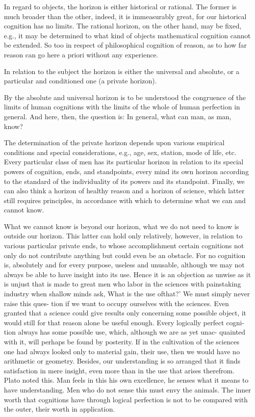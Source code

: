 In regard to objects, the horizon is either historical or rational.
The former is much broader than the other, indeed, it is immeasurably great,
for our historical cognition has no limits.
The rational horizon, on the other hand, may be fixed,
e.g., it may be determined to what kind of objects
mathematical cognition cannot be extended.
So too in respect of philosophical cognition of reason,
as to how far reason can go here a priori without any experience.

In relation to the subject the horizon is
either the universal and absolute,
or a particular and conditioned one (a private horizon).

By the absolute and universal horizon is to be understood
the congruence of the limits of human cognitions with
the limits of the whole of human perfection in general.
And here, then, the question is:
In general, what can man, as man, know?

The determination of the private horizon depends upon
various empirical conditions and special considerations,
e.g., age, sex, station, mode of life, etc.
Every particular class of men has its particular horizon
in relation to its special powers of cognition, ends, and standpoints,
every mind its own horizon according to the standard of
the individuality of its powers and its standpoint.
Finally, we can also think a horizon of healthy reason
and a horizon of science,
which latter still requires principles,
in accordance with which to determine
what we can and cannot know.

What we cannot know is beyond our horizon,
what we do not need to know is outside our horizon.
 This latter can hold only relatively, however,
in relation to various particular private ends, to whose accomplishment
certain cognitions not only do not contribute anything but could even be
an obstacle. For no cognition is, absolutely and for every purpose, useless
and unusable, although we may not always be able to have insight into its
use. Hence it is an objection as unwise as it is unjust that is made to great
men who labor in the sciences with painstaking industry when shallow
minds ask, What is the use ofthat?' We must simply never raise this ques-
tion if we want to occupy ourselves with the sciences. Even granted that a
science could give results only concerning some possible object, it would
still for that reason alone be useful enough. Every logically perfect cogni-
tion always has some possible use, which, although we are as yet unac-
quainted with it, will perhaps be found by posterity. If in the cultivation of
the sciences one had always looked only to material gain, their use, then
we would have no arithmetic or geometry. Besides, our understanding is
so arranged that it finds satisfaction in mere insight, even more than in the
use that arises therefrom. Plato noted this. Man feels in this his own
excellence, he senses what it means to have understanding. Men who do
not sense this must envy the animals. The inner worth that cognitions have
through logical perfection is not to be compared with the outer, their worth
in application.

